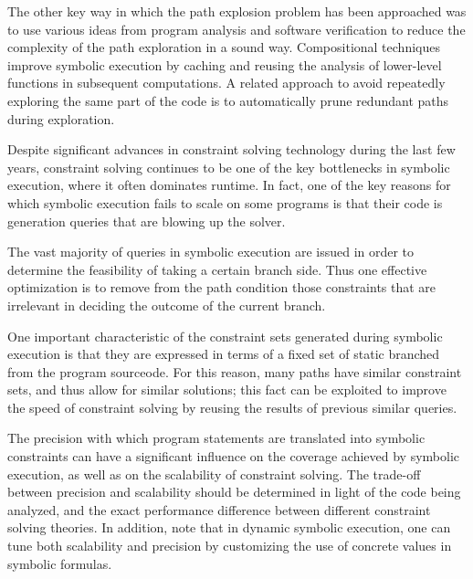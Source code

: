 The other key way in which the path explosion problem has been approached was to use various ideas from program analysis and software verification to reduce the complexity of the path exploration in a sound way.
Compositional techniques improve symbolic execution by caching and reusing the analysis of lower-level functions in subsequent computations.
A related approach to avoid repeatedly exploring the same part of the code is to automatically prune redundant paths during exploration.

Despite significant advances in constraint solving technology during the last few years, constraint solving continues to be one of the key bottlenecks in symbolic execution, where it often dominates runtime. In fact, one of the key reasons for which symbolic execution fails to scale on some programs is that their code is generation queries that are blowing up the solver.

The vast majority of queries in symbolic execution are issued in order to determine the feasibility of taking a certain branch side. Thus one effective optimization is to remove from the path condition those constraints that are irrelevant in deciding the outcome of the current branch.

One important characteristic of the constraint sets generated during symbolic execution is that they are expressed in terms of a fixed set of static branched from the program sourceode. For this reason, many paths have similar constraint sets, and thus allow for similar solutions; this fact can be exploited to improve the speed of constraint solving by reusing the results of previous similar queries.

The precision with which program statements are translated into symbolic constraints can have a significant influence on the coverage achieved by symbolic execution, as well as on the scalability of constraint solving.
The trade-off between precision and scalability should be determined in light of the code being analyzed, and the exact performance difference between different constraint solving theories. In addition, note that in dynamic symbolic execution, one can tune both scalability and precision by customizing the use of concrete values in symbolic formulas.